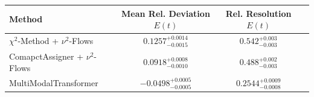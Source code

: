     \begin{tabular}{lccc}
        \toprule
        Method & Mean Rel. Deviation $E(t)$ & Rel. Resolution $E(t)$ \\
        \midrule
        $\chi^2$-Method + $\nu^2$-Flows & $0.1257^{+0.0014}_{-0.0015}$ & $0.542^{+0.003}_{-0.003}$ \\
        ComapctAssigner + $\nu^2$-Flows & $0.0918^{+0.0008}_{-0.0010}$ & $0.488^{+0.002}_{-0.003}$ \\
        MultiModalTransformer & $-0.0498^{+0.0005}_{-0.0005}$ & $0.2544^{+0.0009}_{-0.0008}$ \\
        \bottomrule
    \end{tabular}